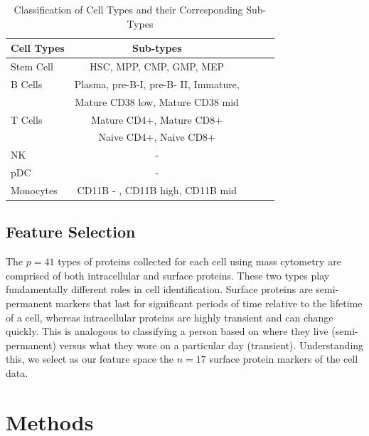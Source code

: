 \documentclass{article}
\begin{document}
\begin{table}
\caption{Classification of Cell Types and their Corresponding Sub-Types}
\label{table_cell_type}
\vskip 0.15in
\begin{center}
\begin{small}
\begin{sc}
\begin{tabular}{lcccr}
\hline
\abovespace\belowspace
Cell Types & Sub-types  \\
\hline
\abovespace
Stem Cell	&  HSC, MPP, CMP, GMP, MEP \\
B Cells 	& Plasma, pre-B-I, pre-B- II, Immature, \\ 
		&			Mature CD38 low, Mature CD38 mid\\
T Cells	& Mature CD4+, Mature CD8+ \\
		& Naive CD4+, Naive CD8+  \\
NK		& -   \\
pDC		& - \\
\belowspace
Monocytes & CD11B - , CD11B high, CD11B mid \\
\hline
\end{tabular}
\end{sc}
\end{small}
\end{center}
\vskip -0.1in
\end{table}

\subsection{Feature Selection}
The $p=41$ types of proteins collected for each cell using mass cytometry are comprised of both intracellular and surface proteins. These two types play fundamentally different roles in cell identification. Surface proteins are semi-permanent markers that last for significant periods of time relative to the lifetime of a cell, whereas intracellular proteins are highly transient and can change quickly. This is analogous to classifying a person based on where they live (semi-permanent) versus what they wore on a particular day (transient). Understanding this, we select as our feature space the $n=17$ surface protein markers of the cell data.

\section{Methods}
\label{methods}
\end{document}
